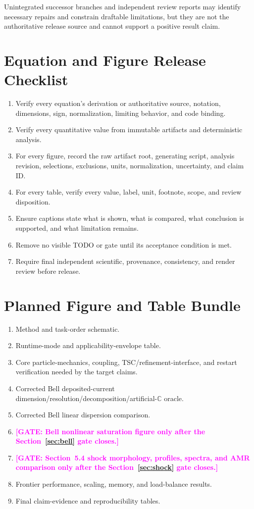 \documentclass[twocolumn]{aastex701}
\newcommand{\GATE}[1]{\textcolor{magenta}{\textbf{[GATE: #1]}}}
\begin{document}
Unintegrated successor branches and independent review reports may identify
necessary repairs and constrain draftable limitations, but they are not the
authoritative release source and cannot support a positive result claim.

\section{Equation and Figure Release Checklist}
\label{app:release-checklist}

\begin{enumerate}
\item Verify every equation's derivation or authoritative source, notation,
dimensions, sign, normalization, limiting behavior, and code binding.
\item Verify every quantitative value from immutable artifacts and deterministic
analysis.
\item For every figure, record the raw artifact root, generating script,
analysis revision, selections, exclusions, units, normalization, uncertainty,
and claim ID.
\item For every table, verify every value, label, unit, footnote, scope, and
review disposition.
\item Ensure captions state what is shown, what is compared, what conclusion is
supported, and what limitation remains.
\item Remove no visible TODO or gate until its acceptance condition is met.
\item Require final independent scientific, provenance, consistency, and render
review before release.
\end{enumerate}

\section{Planned Figure and Table Bundle}
\label{app:planned-bundle}

\begin{enumerate}
\item Method and task-order schematic.
\item Runtime-mode and applicability-envelope table.
\item Core particle-mechanics, coupling, TSC/refinement-interface, and restart
verification needed by the target claims.
\item Corrected Bell deposited-current
dimension/resolution/decomposition/artificial-$\mathbb{C}$ oracle.
\item Corrected Bell linear dispersion comparison.
\item \GATE{Bell nonlinear saturation figure only after the Section~\ref{sec:bell}
gate closes.}
\item \GATE{Section~5.4 shock morphology, profiles, spectra, and AMR comparison
only after the Section~\ref{sec:shock} gate closes.}
\item Frontier performance, scaling, memory, and load-balance results.
\item Final claim-evidence and reproducibility tables.
\end{enumerate}



\end{document}
